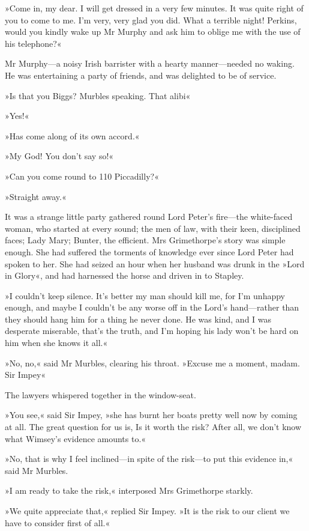 »Come in, my dear. I will get dressed in a very few minutes. It was quite right of you to come to me. I'm very, very glad you did. What a terrible night! Perkins, would you kindly wake up Mr Murphy and ask him to oblige me with the use of his telephone?«

Mr Murphy—a noisy Irish barrister with a hearty manner—needed no waking. He was entertaining a party of friends, and was delighted to be of service.

»Is that you Biggs? Murbles speaking. That alibi\longdash«

»Yes!«

»Has come along of its own accord.«

»My God! You don't say so!«

»Can you come round to 110 Piccadilly?«

»Straight away.«

It was a strange little party gathered round Lord Peter's fire—the white-faced woman, who started at every sound; the men of law, with their keen, disciplined faces; Lady Mary; Bunter, the efficient. Mrs Grimethorpe's story was simple enough. She had suffered the torments of knowledge ever since Lord Peter had spoken to her. She had seized an hour when her husband was drunk in the »Lord in Glory«, and had harnessed the horse and driven in to Stapley.

»I couldn't keep silence. It's better my man should kill me, for I'm unhappy enough, and maybe I couldn't be any worse off in the Lord's hand—rather than they should hang him for a thing he never done. He was kind, and I was desperate miserable, that's the truth, and I'm hoping his lady won't be hard on him when she knows it all.«

»No, no,« said Mr Murbles, clearing his throat. »Excuse me a moment, madam. Sir Impey\longdash«

The lawyers whispered together in the window-seat.

»You see,« said Sir Impey, »she has burnt her boats pretty well now by coming at all. The great question for us is, Is it worth the risk? After all, we don't know what Wimsey's evidence amounts to.«

»No, that is why I feel inclined—in spite of the risk—to put this evidence in,« said Mr Murbles.

»I am ready to take the risk,« interposed Mrs Grimethorpe starkly.

»We quite appreciate that,« replied Sir Impey. »It is the risk to our client we have to consider first of all.«

